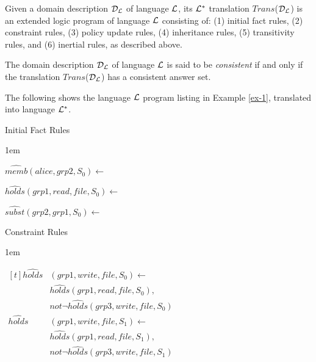 \documentclass[global,twocolumn,final]{svjour}
\newenvironment{vdefinition}
  {\begin{definition}\hspace{0.25em}}
  {\end{definition}}
\newenvironment{vexample}
  {\begin{example}\hspace{0.25em}}
  {\end{example}}
\newenvironment{vquote}
  {\begin{list}{}{\leftmargin 1em}\item[]}
  {\end{list}}
\begin{document}
        \begin{vdefinition}
          \label{def-trans}
          Given a domain description ${\cal D_{L}}$ of language ${\cal L}$, its
          ${\cal L^{*}}$ translation $Trans$(${\cal D_{L}}$) is an extended
          logic program of language ${\cal L}$ consisting of: (1) initial fact
          rules, (2) constraint rules, (3) policy update rules, (4) inheritance
          rules, (5) transitivity rules, and (6) inertial rules, as described
          above.

          The domain description ${\cal D_{L}}$ of language ${\cal L}$ is said
          to be {\em consistent} if and only if the translation
          $Trans$(${\cal D_{L}}$) has a consistent answer set.
        \end{vdefinition}

        \begin{vexample}
          \label{ex-2}
          The following shows the language ${\cal L}$ program listing in
          Example \ref{ex-1},  translated into language ${\cal L}^{*}$.

          \begin{enumerate}
            \item
              Initial Fact Rules

              \begin{vquote}
                $\hat{memb}(alice, grp2, S_{0}) \leftarrow$

                $\hat{holds}(grp1, read, file,S_{0}) \leftarrow$

                $\hat{subst}(grp2, grp1, S_{0}) \leftarrow$
              \end{vquote}

            \item
              Constraint Rules

              \begin{vquote}
                \begin{math}
                  \begin{aligned}[t]
                    \hat{holds}&(grp1, write, file, S_{0}) \leftarrow \\
                    & \hat{holds}(grp1, read, file, S_{0}), \\
                    & not \lnot \hat{holds}(grp3, write, file, S_{0}) \\
                    \hat{holds}&(grp1, write, file, S_{1}) \leftarrow \\
                    & \hat{holds}(grp1, read, file, S_{1}), \\
                    & not \lnot \hat{holds}(grp3, write, file, S_{1})
                  \end{aligned}
                \end{math}
              \end{vquote}


\end{enumerate}
\end{vexample}
\end{document}
